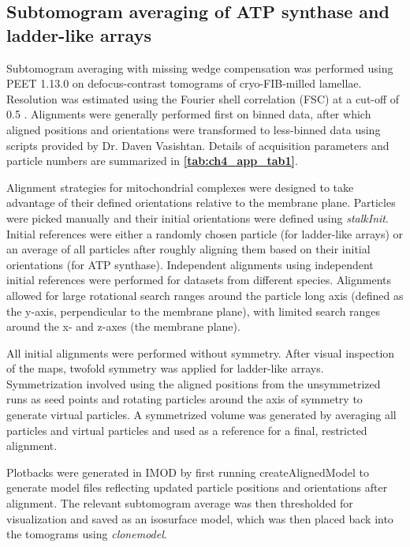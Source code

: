 \subsection*{Subtomogram averaging of ATP synthase and ladder-like arrays}
Subtomogram averaging with missing wedge compensation was performed using PEET 1.13.0 \cite{Heumann2011, Nicastro2006} on defocus-contrast tomograms of cryo-FIB-milled lamellae. Resolution was estimated using the Fourier shell correlation (FSC) at a cut-off of 0.5 \cite{Nicastro2006}. Alignments were generally performed first on binned data, after which aligned positions and orientations were transformed to less-binned data using scripts provided by Dr. Daven Vasishtan. Details of acquisition parameters and particle numbers are summarized in \textbf{\autoref{tab:ch4_app_tab1}}.

Alignment strategies for mitochondrial complexes were designed to take advantage of their defined orientations relative to the membrane plane. Particles were picked manually and their initial orientations were defined using \emph{stalkInit}. Initial references were either a randomly chosen particle (for ladder-like arrays) or an average of all particles after roughly aligning them based on their initial orientations (for ATP synthase). Independent alignments using independent initial references were performed for datasets from different species. Alignments allowed for large rotational search ranges around the particle long axis (defined as the y-axis, perpendicular to the membrane plane), with limited search ranges around the x- and z-axes (the membrane plane).

All initial alignments were performed without symmetry. After visual inspection of the maps, twofold symmetry was applied for ladder-like arrays. Symmetrization involved using the aligned positions from the unsymmetrized runs as seed points and rotating particles around the axis of symmetry to generate virtual particles. A symmetrized volume was generated by averaging all particles and virtual particles and used as a reference for a final, restricted alignment.

Plotbacks were generated in IMOD by first running createAlignedModel to generate model files reflecting updated particle positions and orientations after alignment. The relevant subtomogram average was then thresholded for visualization and saved as an isosurface model, which was then placed back into the tomograms using \emph{clonemodel}.
%
